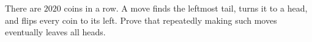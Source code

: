 There are $2020$ coins in a row. A move finds the leftmost tail, turns it to a head, and flips every coin to its left. Prove that repeatedly making such moves eventually leaves all heads.
